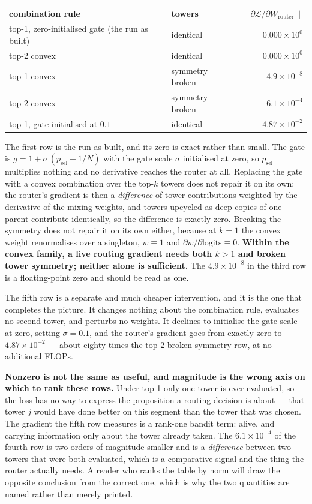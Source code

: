 \documentclass[11pt]{article}
\begin{document}
\begin{center}
\begin{tabular}{@{}llr@{}}
\toprule
combination rule & towers & $\lVert \partial\mathcal{L}/\partial W_{\mathrm{router}} \rVert$ \\
\midrule
top-1, zero-initialised gate (the run as built) & identical & $0.000\times10^{0}$ \\
top-2 convex & identical & $0.000\times10^{0}$ \\
top-1 convex & symmetry broken & $4.9\times10^{-8}$ \\
top-2 convex & symmetry broken & $6.1\times10^{-4}$ \\
\addlinespace
top-1, gate initialised at $0.1$ & identical & $4.87\times10^{-2}$ \\
\bottomrule
\end{tabular}
\end{center}

The first row is the run as built, and its zero is exact rather than small. The gate is $g = 1 + \sigma\,(p_{\mathrm{sel}} - 1/N)$ with the gate scale $\sigma$ initialised at zero, so $p_{\mathrm{sel}}$ multiplies nothing and no derivative reaches the router at all. Replacing the gate with a convex combination over the top-$k$ towers does not repair it on its own: the router's gradient is then a \emph{difference} of tower contributions weighted by the derivative of the mixing weights, and towers upcycled as deep copies of one parent contribute identically, so the difference is exactly zero. Breaking the symmetry does not repair it on its own either, because at $k=1$ the convex weight renormalises over a singleton, $w \equiv 1$ and $\partial w/\partial\text{logits} \equiv 0$. \textbf{Within the convex family, a live routing gradient needs both $k > 1$ and broken tower symmetry; neither alone is sufficient.} The $4.9\times10^{-8}$ in the third row is a floating-point zero and should be read as one.

The fifth row is a separate and much cheaper intervention, and it is the one that completes the picture. It changes nothing about the combination rule, evaluates no second tower, and perturbs no weights. It declines to initialise the gate scale at zero, setting $\sigma = 0.1$, and the router's gradient goes from exactly zero to $4.87\times10^{-2}$ --- about eighty times the top-2 broken-symmetry row, at no additional FLOPs.

\textbf{Nonzero is not the same as useful, and magnitude is the wrong axis on which to rank these rows.} Under top-1 only one tower is ever evaluated, so the loss has no way to express the proposition a routing decision is about --- that tower $j$ would have done better on this segment than the tower that was chosen. The gradient the fifth row measures is a rank-one bandit term: alive, and carrying information only about the tower already taken. The $6.1\times10^{-4}$ of the fourth row is two orders of magnitude smaller and is a \emph{difference} between two towers that were both evaluated, which is a comparative signal and the thing the router actually needs. A reader who ranks the table by norm will draw the opposite conclusion from the correct one, which is why the two quantities are named rather than merely printed.
\end{document}
